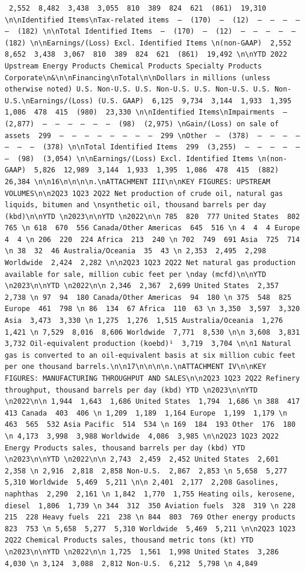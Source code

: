 \documentclass[
  letterpaper,
  DIV=11,
  numbers=noendperiod]{scrreprt}
\begin{document}
\begin{verbatim}
 2,552  8,482  3,438  3,055  810  389  824  621  (861)  19,310 \n\nIdentified Items\nTax-related items  —  (170)  —  (12)  —  —  —  —  —  (182) \n\nTotal Identified Items  —  (170)  —  (12)  —  —  —  —  —  (182) \n\nEarnings/(Loss) Excl. Identified Items \n(non-GAAP)  2,552  8,652  3,438  3,067  810  389  824  621  (861)  19,492 \n\nYTD 2022 Upstream Energy Products Chemical Products Specialty Products Corporate\n&\n\nFinancing\nTotal\n\nDollars in millions (unless otherwise noted) U.S. Non-U.S. U.S. Non-U.S. U.S. Non-U.S. U.S. Non-U.S.\nEarnings/(Loss) (U.S. GAAP)  6,125  9,734  3,144  1,933  1,395  1,086  478  415  (980)  23,330 \n\nIdentified Items\nImpairments  —  (2,877)  —  —  —  —  —  —  (98)  (2,975) \nGain/(Loss) on sale of assets  299  —  —  —  —  —  —  —  —  299 \nOther  —  (378)  —  —  —  —  —  —  —  (378) \n\nTotal Identified Items  299  (3,255)  —  —  —  —  —  —  (98)  (3,054) \n\nEarnings/(Loss) Excl. Identified Items \n(non-GAAP)  5,826  12,989  3,144  1,933  1,395  1,086  478  415  (882)  26,384 \n\n16\n\n\n\n.\nATTACHMENT III\n\nKEY FIGURES: UPSTREAM VOLUMES\n\n2Q23 1Q23 2Q22 Net production of crude oil, natural gas liquids, bitumen and \nsynthetic oil, thousand barrels per day (kbd)\n\nYTD \n2023\n\nYTD \n2022\n\n 785  820  777 United States  802  765 \n 618  670  556 Canada/Other Americas  645  516 \n 4  4  4 Europe  4  4 \n 206  220  224 Africa  213  240 \n 702  749  691 Asia  725  714 \n 38  32  46 Australia/Oceania  35  43 \n 2,353  2,495  2,298 Worldwide  2,424  2,282 \n\n2Q23 1Q23 2Q22 Net natural gas production available for sale, million cubic feet per \nday (mcfd)\n\nYTD \n2023\n\nYTD \n2022\n\n 2,346  2,367  2,699 United States  2,357  2,738 \n 97  94  180 Canada/Other Americas  94  180 \n 375  548  825 Europe  461  798 \n 86  134  67 Africa  110  63 \n 3,350  3,597  3,320 Asia  3,473  3,330 \n 1,275  1,276  1,515 Australia/Oceania  1,276  1,421 \n 7,529  8,016  8,606 Worldwide  7,771  8,530 \n\n 3,608  3,831  3,732 Oil-equivalent production (koebd)¹  3,719  3,704 \n\n1 Natural gas is converted to an oil-equivalent basis at six million cubic feet per one thousand barrels.\n\n17\n\n\n\n.\nATTACHMENT IV\n\nKEY FIGURES: MANUFACTURING THROUGHPUT AND SALES\n\n2Q23 1Q23 2Q22 Refinery throughput, thousand barrels per day (kbd) YTD \n2023\n\nYTD \n2022\n\n 1,944  1,643  1,686 United States  1,794  1,686 \n 388  417  413 Canada  403  406 \n 1,209  1,189  1,164 Europe  1,199  1,179 \n 463  565  532 Asia Pacific  514  534 \n 169  184  193 Other  176  180 \n 4,173  3,998  3,988 Worldwide  4,086  3,985 \n\n2Q23 1Q23 2Q22 Energy Products sales, thousand barrels per day (kbd) YTD \n2023\n\nYTD \n2022\n\n 2,743  2,459  2,452 United States  2,601  2,358 \n 2,916  2,818  2,858 Non-U.S.  2,867  2,853 \n 5,658  5,277  5,310 Worldwide  5,469  5,211 \n\n 2,401  2,177  2,208 Gasolines, naphthas  2,290  2,161 \n 1,842  1,770  1,755 Heating oils, kerosene, diesel  1,806  1,739 \n 344  312  350 Aviation fuels  328  319 \n 228  215  228 Heavy fuels  221  238 \n 844  803  769 Other energy products  823  753 \n 5,658  5,277  5,310 Worldwide  5,469  5,211 \n\n2Q23 1Q23 2Q22 Chemical Products sales, thousand metric tons (kt) YTD \n2023\n\nYTD \n2022\n\n 1,725  1,561  1,998 United States  3,286  4,030 \n 3,124  3,088  2,812 Non-U.S.  6,212  5,798 \n 4,849  
\end{verbatim}
\end{document}

